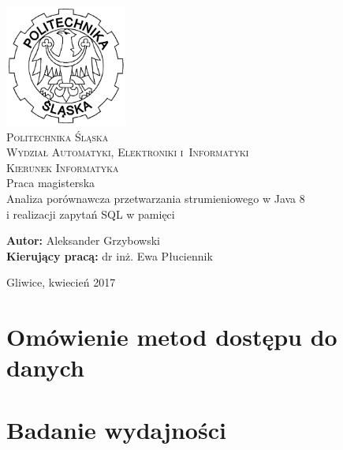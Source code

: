 \documentclass[12pt]{extarticle}
\begin{document}
\begin{titlepage}
    \begin{center}
        \includegraphics[width=4cm]{polsl.png}\\[1cm]
        \textsc{\LARGE{Politechnika Śląska}}\\[0.5cm]
        \textsc{\LARGE{Wydział Automatyki, Elektroniki i~Informatyki}}\\[0.5cm]
        \textsc{\LARGE{Kierunek Informatyka}}\\[2.5cm]
        \LARGE{Praca magisterska}\\[1cm]
        \begingroup
            \fontsize{14pt}{17pt}\selectfont
            Analiza porównawcza przetwarzania strumieniowego w Java 8 \\ i realizacji zapytań SQL w pamięci
        \endgroup
    \end{center}
    \vspace{2cm}
    \begingroup
        \fontsize{14pt}{17pt}\selectfont
        \textbf{Autor:} Aleksander Grzybowski\\
        \textbf{Kierujący pracą:} dr inż. Ewa Płuciennik\\
    \endgroup

    \vspace{1.0cm}
    \begingroup
        \fontsize{12pt}{14pt}\selectfont
        \begin{center}
        Gliwice, kwiecień 2017
        \end{center}
    \endgroup
\end{titlepage}

\clearpage\mbox{}\clearpage

\tableofcontents

\newpage

\section{Omówienie metod dostępu do danych}



\section{Badanie wydajności}
\end{document}
